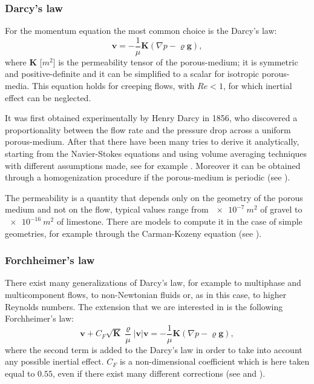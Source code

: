 \subsubsection{Darcy's law}
For the momentum equation the most common choice is the Darcy's law:
\begin{equation} \label{eq:darcy}
	\mathbf{v} = -\frac{1}{\mu}\mathbf{K} (\nabla p - \varrho \mathbf{g}),
\end{equation}
where $\mathbf{K}$ [$\si{m^2}$] is the permeability tensor of the 
porous-medium; it is symmetric and positive-definite and it can be simplified 
to a scalar for isotropic porous-media. 
This equation holds for creeping flows, with $Re < 1$, for which 
inertial effect can be neglected.

It was first obtained experimentally by Henry Darcy in 1856, who discovered a 
proportionality between the flow rate and the pressure drop across a uniform 
porous-medium. After that there have been many tries to derive it analytically, 
starting from the Navier-Stokes equations and using volume averaging techniques 
with different assumptions made, see for example \cite{volaver:ithakerdarcy}. 
Moreover it can be obtained through a homogenization procedure if the 
porous-medium is periodic (see \cite{homo:holmes}).

The permeability is a quantity that depends only on the geometry of the porous 
medium and not on the flow, typical values range from $\SI{e-7}{m^2}$ of 
gravel to $\SI{e-16}{m^2}$ of limestone.
There are models to compute it in the case of simple geometries, for example 
through the Carman-Kozeny equation (see \cite{forch:nield}). 
%
\subsubsection{Forchheimer's law}
There exist many generalizations of Darcy's law, for example to multiphase 
and multicomponent flows, to non-Newtonian fluids or, as in this case, to 
higher Reynolds numbers. The 
extension that we are interested in is the following Forchheimer's law:
\begin{equation} \label{eq:forch}
	\mathbf{v} + C_F \sqrt{\mathbf{K}} \frac{\varrho}{\mu} 
	|\mathbf{v}|\mathbf{v} = - \frac{1}{\mu} \mathbf{K}(\nabla p - \varrho 
	\mathbf{g} ),
\end{equation}
where the second term is added to the Darcy's law in order to take into account any possible inertial effect. $C_F$ is a non-dimensional coefficient which is 
here taken equal to $0.55$, even if there exist many different corrections (see 
\cite{forch:nield} and \cite{forch:tesi}).

